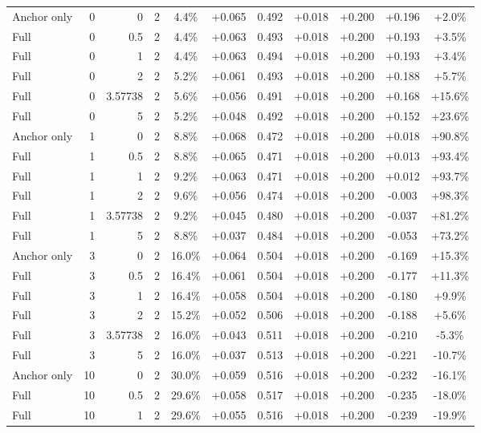 \begin{table}[htbp]
\begin{tabular}{lrrrccccccc}
Anchor only & 0 & 0 & 2 & 4.4\% & +0.065 & 0.492 & +0.018 & +0.200 & +0.196 & +2.0\% \\
Full & 0 & 0.5 & 2 & 4.4\% & +0.063 & 0.493 & +0.018 & +0.200 & +0.193 & +3.5\% \\
Full & 0 & 1 & 2 & 4.4\% & +0.063 & 0.494 & +0.018 & +0.200 & +0.193 & +3.4\% \\
Full & 0 & 2 & 2 & 5.2\% & +0.061 & 0.493 & +0.018 & +0.200 & +0.188 & +5.7\% \\
Full & 0 & 3.57738 & 2 & 5.6\% & +0.056 & 0.491 & +0.018 & +0.200 & +0.168 & +15.6\% \\
Full & 0 & 5 & 2 & 5.2\% & +0.048 & 0.492 & +0.018 & +0.200 & +0.152 & +23.6\% \\
Anchor only & 1 & 0 & 2 & 8.8\% & +0.068 & 0.472 & +0.018 & +0.200 & +0.018 & +90.8\% \\
Full & 1 & 0.5 & 2 & 8.8\% & +0.065 & 0.471 & +0.018 & +0.200 & +0.013 & +93.4\% \\
Full & 1 & 1 & 2 & 9.2\% & +0.063 & 0.471 & +0.018 & +0.200 & +0.012 & +93.7\% \\
Full & 1 & 2 & 2 & 9.6\% & +0.056 & 0.474 & +0.018 & +0.200 & -0.003 & +98.3\% \\
Full & 1 & 3.57738 & 2 & 9.2\% & +0.045 & 0.480 & +0.018 & +0.200 & -0.037 & +81.2\% \\
Full & 1 & 5 & 2 & 8.8\% & +0.037 & 0.484 & +0.018 & +0.200 & -0.053 & +73.2\% \\
Anchor only & 3 & 0 & 2 & 16.0\% & +0.064 & 0.504 & +0.018 & +0.200 & -0.169 & +15.3\% \\
Full & 3 & 0.5 & 2 & 16.4\% & +0.061 & 0.504 & +0.018 & +0.200 & -0.177 & +11.3\% \\
Full & 3 & 1 & 2 & 16.4\% & +0.058 & 0.504 & +0.018 & +0.200 & -0.180 & +9.9\% \\
Full & 3 & 2 & 2 & 15.2\% & +0.052 & 0.506 & +0.018 & +0.200 & -0.188 & +5.6\% \\
Full & 3 & 3.57738 & 2 & 16.0\% & +0.043 & 0.511 & +0.018 & +0.200 & -0.210 & -5.3\% \\
Full & 3 & 5 & 2 & 16.0\% & +0.037 & 0.513 & +0.018 & +0.200 & -0.221 & -10.7\% \\
Anchor only & 10 & 0 & 2 & 30.0\% & +0.059 & 0.516 & +0.018 & +0.200 & -0.232 & -16.1\% \\
Full & 10 & 0.5 & 2 & 29.6\% & +0.058 & 0.517 & +0.018 & +0.200 & -0.235 & -18.0\% \\
Full & 10 & 1 & 2 & 29.6\% & +0.055 & 0.516 & +0.018 & +0.200 & -0.239 & -19.9\% \\

\end{tabular}
\end{table}
